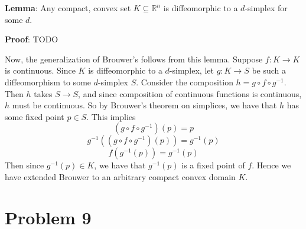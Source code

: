 \documentclass[10pt,letter]{article}
\begin{document}
\textbf{Lemma}: Any compact, convex set $K \subseteq \mathbb{R}^n$ is diffeomorphic to a $d$-simplex for some $d$.

\textbf{Proof}: TODO

Now, the generalization of Brouwer's follows from this lemma. Suppose $f: K \to K$ is continuous. Since $K$ is diffeomorphic to a $d$-simplex, let $g: K \to S$ be such a diffeomorphism to some $d$-simplex $S$. Consider the composition $h = g\circ f \circ g^{-1}$. Then $h$ takes $S \to S$, and since composition of continuous functions is continuous, $h$ must be continuous. So by Brouwer's theorem on simplices, we have that $h$ has some fixed point $p \in S$. This implies
\[ (g \circ f \circ g^{-1}) (p) = p \]
\[ g^{-1}((g \circ f \circ g^{-1}) (p)) = g^{-1}(p)\]
\[ f(g^{-1}(p)) = g^{-1}(p) \]
Then since $g^{-1}(p) \in K$, we have that $g^{-1}(p)$ is a fixed point of $f$. Hence we have extended Brouwer to an arbitrary compact convex domain $K$.
\section*{Problem 9}
\end{document}
